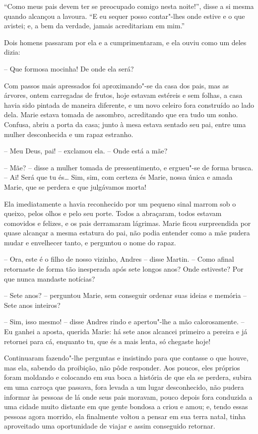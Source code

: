 ``Como meus pais devem ter se preocupado comigo nesta noite!'', 
disse a si mesma quando alcançou a lavoura. ``E eu sequer posso
contar"-lhes onde estive e o que avistei; e, a bem da verdade, 
jamais acreditariam em mim.''

Dois homens passaram por ela e a cumprimentaram, e ela ouviu 
como um deles dizia:

-- Que formosa mocinha! De onde ela será?

Com passos mais apressados foi aproximando"-se da casa dos pais, mas as
árvores, ontem carregadas de frutos, hoje estavam estéreis e sem
folhas, a casa havia sido pintada de maneira diferente, e um novo
celeiro fora construído ao lado dela. Marie estava tomada de assombro,
acreditando que era tudo um sonho. Confusa, abriu a porta da casa;
junto à mesa estava sentado seu pai, entre uma mulher desconhecida e um
rapaz estranho.

-- Meu Deus, pai! -- exclamou ela. -- Onde está a mãe?

-- Mãe? -- disse a mulher tomada de pressentimento, e ergueu"-se de
forma brusca. -- Ai! Será que tu és\ldots{} Sim, sim, com certeza és Marie,
nossa única e amada Marie, que se perdera e que julgávamos morta!

Ela imediatamente a havia reconhecido por um pequeno sinal marrom sob o
queixo, pelos olhos e pelo seu porte. Todos a abraçaram, todos estavam
comovidos e felizes, e os pais derramaram lágrimas. Marie ficou
surpreendida por quase alcançar a mesma estatura do pai, não podia
entender como a mãe pudera mudar e envelhecer tanto, e perguntou o nome
do rapaz.

-- Ora, este é o filho de nosso vizinho, Andres -- disse Martin. --
Como afinal retornaste de forma tão inesperada após sete longos anos?
Onde estiveste? Por que nunca mandaste notícias?

-- Sete anos? -- perguntou Marie, sem conseguir ordenar suas ideias e
memória -- Sete anos inteiros?

-- Sim, isso mesmo! -- disse Andres rindo e
apertou"-lhe a mão calorosamente. -- Eu ganhei a aposta, querida Marie: há
sete anos alcancei primeiro a pereira e já retornei para cá, enquanto
tu, que és a mais lenta, só chegaste hoje!

Continuaram fazendo"-lhe perguntas e insistindo para que contasse o que
houve, mas ela, sabendo da proibição, não pôde responder. Aos poucos,
eles próprios foram moldando e colocando em sua boca a história de que
ela se perdera, subira em uma carroça que passava, fora levada a um
lugar desconhecido, não pudera informar às pessoas de lá onde seus pais
moravam, pouco depois fora conduzida a uma cidade muito distante em que
gente bondosa a criou e amou; e, tendo essas pessoas agora morrido, ela
finalmente voltou a pensar em sua terra natal, tinha aproveitado uma
oportunidade de viajar e assim conseguido retornar.

